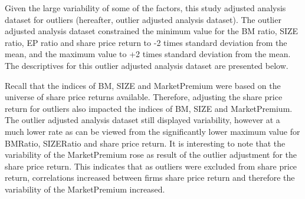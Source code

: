 Given the large variability of some of the factors, this study adjusted analysis dataset for outliers (hereafter, outlier adjusted analysis dataset). The outlier adjusted analysis dataset constrained the minimum value for the BM ratio, SIZE ratio, EP ratio and share price return to -2 times standard deviation from the mean, and the maximum value to +2 times standard deviation from the mean. The descriptives for this outlier adjusted analysis dataset are presented below.
\begin{table}[H] 
\centering
\caption{Descriptive statistics variables outlier adjusted} 
\end{table} 
Recall that the indices of BM, SIZE and MarketPremium were based on the universe of share price returns available. Therefore, adjusting the share price return for outliers also impacted the indices of BM, SIZE and MarketPremium. The outlier adjusted analysis dataset still displayed variability, however at a much lower rate as can be viewed from the significantly lower maximum value for BMRatio, SIZERatio and share price return. It is interesting to note that the variability of the MarketPremium rose as result of the outlier adjustment for the share price return. This indicates that as outliers were excluded from share price return, correlations increased between firms share price return and therefore the variability of the MarketPremium increased.


